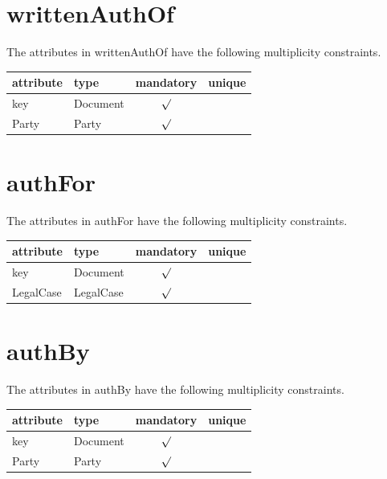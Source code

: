 \documentclass[10pt,a4paper]{report}              %
\theoremstyle{plain}\theorembodyfont{\rmfamily}\newtheorem{definition}{Definition}[section]
\theoremstyle{plain}\theorembodyfont{\rmfamily}\newtheorem{designrule}[definition]{Requirement}
\begin{document}
\section{writtenAuthOf}

\label{sct:plug writtenAuthOf}

The attributes in writtenAuthOf have the following multiplicity constraints. 

\begin{center}
\begin{tabular}{llcc}
attribute & type & mandatory & unique\\
\hline
key  & Document & $\surd$ & \\
Party & Party & $\surd$ & \\
\end{tabular}
\end{center}

\section{authFor}

\label{sct:plug authFor}

The attributes in authFor have the following multiplicity constraints. 

\begin{center}
\begin{tabular}{llcc}
attribute & type & mandatory & unique\\
\hline
key  & Document & $\surd$ & \\
LegalCase & LegalCase & $\surd$ & \\
\end{tabular}
\end{center}

\section{authBy}

\label{sct:plug authBy}

The attributes in authBy have the following multiplicity constraints. 

\begin{center}
\begin{tabular}{llcc}
attribute & type & mandatory & unique\\
\hline
key  & Document & $\surd$ & \\
Party & Party & $\surd$ & \\
\end{tabular}
\end{center}
\end{document}
